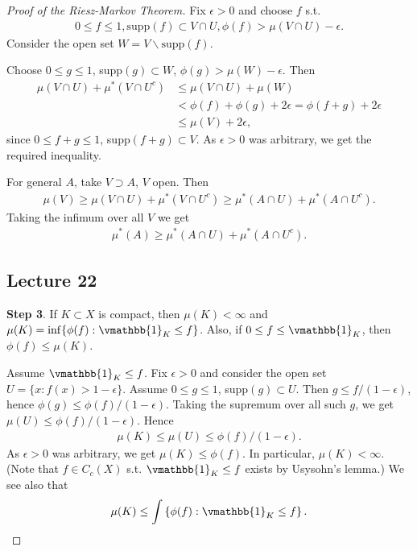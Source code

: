 \begin{proof}[Proof of the Riesz-Markov Theorem]
    Fix \(\epsilon>0\) and choose \(f\) s.t.
    \begin{align*}
        0\leq f\leq 1, \text{supp}(f)\subset V\cap U, \phi(f)>\mu\left(V\cap U\right) - \epsilon.
    \end{align*}
    Consider the open set \(W=V\backslash\text{supp}(f)\).

    Choose \(0\leq g\leq 1\), supp\((g)\subset W\), \(\phi(g)>\mu(W)-\epsilon\). Then
    \begin{align*}
        \mu\left(V\cap U\right) + \mu^*\left(V\cap U^c\right) &\leq \mu\left(V\cap U\right) + \mu(W) \\
        &< \phi(f) + \phi(g) + 2\epsilon = \phi(f+g) + 2\epsilon \\
        &\leq \mu(V) + 2\epsilon,
    \end{align*}
    since \(0\leq f+g\leq 1\), supp\((f+g)\subset V\). As \(\epsilon>0\) was arbitrary, we get the required inequality. 

    For general \(A\), take \(V\supset A\), \(V\) open. Then 
    \begin{align*}
        \mu(V) \geq \mu\left(V\cap U\right) + \mu^*\left(V\cap U^c\right) \geq \mu^*\left(A\cap U\right) + \mu^*\left(A\cap U^c\right).
    \end{align*}
    Taking the infimum over all \(V\) we get
    \begin{align*}
        \mu^*(A) \geq \mu^*\left(A\cap U\right) + \mu^*\left(A\cap U^c\right).
    \end{align*}
    
    \subsection*{Lecture 22}
    \setcounter{section}{22}
    \setcounter{theorem}{22}

    \textbf{Step 3}. If \(K\subset X\) is compact, then \(\mu(K)<\infty\) and \\ \(\mu(K)=\inf\{\phi(f):\vmathbb{1}_K\leq f\}\). Also, if \(0\leq f\leq \vmathbb{1}_K\), then \(\phi(f)\leq\mu(K)\).

    Assume \(\vmathbb{1}_K\leq f\). Fix \(\epsilon>0\) and consider the open set \(U=\{x:f(x)>1-\epsilon\}\). Assume \(0\leq g\leq 1\), supp\((g)\subset U\). Then \(g\leq f/(1-\epsilon)\), hence \(\phi(g)\leq \phi(f)/(1-\epsilon)\). Taking the supremum over all such \(g\), we get \(\mu(U)\leq \phi(f)/(1-\epsilon)\). Hence
    \begin{align*}
        \mu(K) \leq\mu(U)\leq\phi(f)/(1-\epsilon).
    \end{align*}
    As \(\epsilon>0\) was arbitrary, we get \(\mu(K)\leq\phi(f)\). In particular, \(\mu(K)<\infty\). (Note that \(f\in C_c(X)\) s.t. \(\vmathbb{1}_K\leq f\) exists by Usysohn's lemma.) We see also that 
    \begin{align*}
        \mu(K)\leq \int\left\{\phi(f):\vmathbb{1}_K\leq f\right\}.
    \end{align*}


\end{proof}
